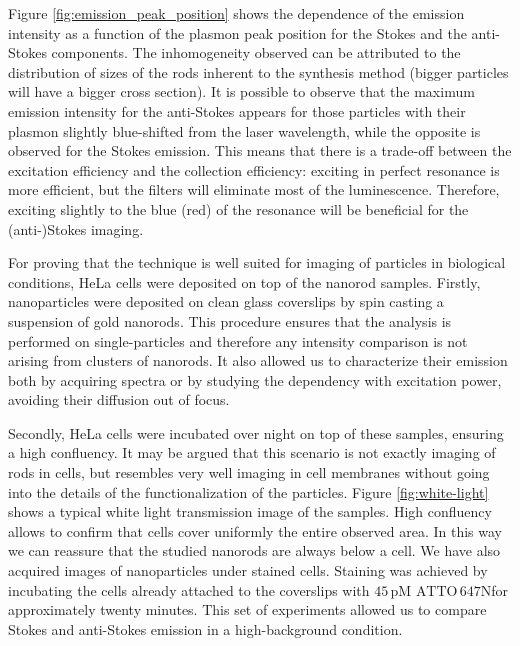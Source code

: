 \documentclass[journal=nalefd,manuscript=letter]{achemso}
\newcommand{\pM}{\ensuremath{\,\textrm{pM}}}
\newcommand{\atto}{\ensuremath{\textrm{ATTO}\,647\textrm{N}}}
\begin{document}
Figure \ref{fig:emission_peak_position} shows the dependence of the emission
intensity as a function of the plasmon peak position for the Stokes and the
anti-Stokes components. The inhomogeneity observed can be attributed to the
distribution of sizes of the rods inherent to the synthesis
method\cite{Zijlstra2011} (bigger particles will have a bigger cross section).
It is possible to observe that the maximum emission intensity for the
anti-Stokes appears for those particles with their plasmon slightly blue-shifted
from the laser wavelength, while the opposite is observed for the Stokes
emission. This means that there is a trade-off between the excitation efficiency
and the collection efficiency: exciting in perfect resonance is more efficient,
but the filters will eliminate most of the luminescence. Therefore, exciting
slightly to the blue (red) of the resonance will be beneficial for the
(anti-)Stokes imaging.

For proving that the technique is well suited for imaging of particles in
biological conditions, HeLa cells were deposited on top of the nanorod samples.
Firstly, nanoparticles were deposited on clean glass coverslips by spin casting
a suspension of gold nanorods. This procedure ensures that the analysis is performed on
single-particles and therefore any intensity comparison is not arising from
clusters of nanorods. It also allowed us to characterize their emission both by
acquiring spectra or by studying the dependency with excitation power, avoiding
their diffusion out of focus. 

Secondly, HeLa cells were incubated over night on top of these samples, ensuring
a high confluency. It may be argued that this scenario is not exactly imaging of
rods in cells, but resembles very well imaging in cell membranes without going
into the details of the functionalization of the particles. Figure
\ref{fig:white-light} shows a typical white light transmission image of the
samples. High confluency allows to confirm that cells cover uniformly the
entire observed area. In this way we can reassure that the studied nanorods are
always below a cell. We have also acquired images of nanoparticles under stained
cells. Staining was achieved by incubating the cells already attached to the
coverslips with $45\pM$ \atto for approximately twenty minutes. This set
of experiments allowed us to compare Stokes and anti-Stokes emission in a
high-background condition.
\end{document}
